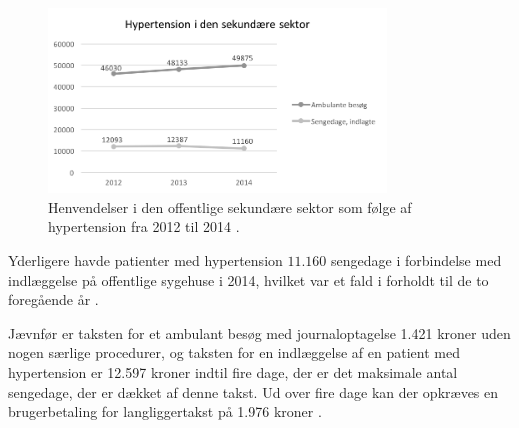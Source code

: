 \begin{figure}[H]
\centering
\includegraphics[width=0.8\textwidth]{figures/hyp_sekundaer}
\caption{Henvendelser i den offentlige sekundære sektor som følge af hypertension fra 2012 til 2014 \citep{sundhedsdatastyrelsen2016}.}
\label{fig:hyp_sekundaer}
\end{figure}

\noindent
Yderligere havde patienter med hypertension $11.160$ sengedage i forbindelse med indlæggelse på offentlige sygehuse i 2014, hvilket var et fald i forholdt til de to foregående år \citep{sundhedsdatastyrelsen2016}. 

Jævnfør \citeauthor{takstvejledning2016} er taksten for et ambulant besøg  med journaloptagelse 1.421 kroner uden nogen særlige procedurer, og taksten for en indlæggelse af en patient med hypertension er 12.597 kroner indtil fire dage, der er det maksimale antal sengedage, der er dækket af denne takst. Ud over fire dage kan der opkræves en brugerbetaling for langliggertakst på 1.976 kroner \citep{takstvejledning2016}.  